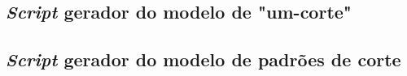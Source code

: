 \documentclass[12pt, a4paper, titlepage]{article}
\begin{document}
\begin{landscape}
    \subsection{\emph{Script} gerador do modelo de "um-corte"{}}
    \label{code:one-cut}
    
    \pagebreak

    \subsection{\emph{Script} gerador do modelo de padrões de corte}
    \label{code:cutting-patterns}
    
\end{landscape}
\end{document}
